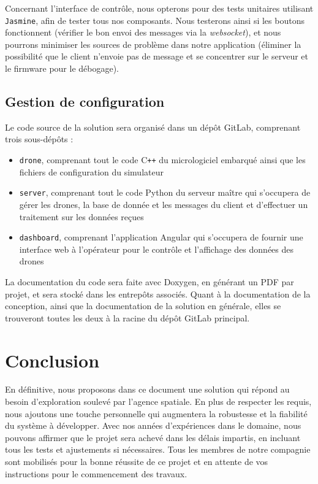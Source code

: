 \documentclass{mistcoursedoc}
\begin{document}
Concernant l'interface de contrôle, nous opterons pour des tests unitaires utilisant \texttt{Jasmine}, afin de tester tous nos composants. Nous testerons ainsi si les boutons fonctionnent (vérifier le bon envoi des messages via la \emph{websocket}), et nous pourrons minimiser les sources de problème dans notre application (éliminer la possibilité que le client n'envoie pas de message et se concentrer sur le serveur et le firmware pour le débogage).

\subsection{Gestion de configuration}

Le code source de la solution sera organisé dans un dépôt GitLab, comprenant trois sous-dépôts :
\begin{itemize}
  \item \texttt{drone}, comprenant tout le code C\texttt{++} du micrologiciel embarqué ainsi que les fichiers de configuration du simulateur
  \item \texttt{server}, comprenant tout le code Python du serveur maître qui s’occupera de gérer les drones, la base de donnée et les messages du client et d’effectuer un traitement sur les données reçues
  \item \texttt{dashboard}, comprenant l'application Angular qui s’occupera de fournir une interface web à l’opérateur pour le contrôle et l’affichage des données des drones
\end{itemize}

La documentation du code sera faite avec Doxygen, en générant un PDF par projet, et sera stocké dans les entrepôts associés. Quant à la documentation de la conception, ainsi que la documentation de la solution en générale, elles se trouveront toutes les deux à la racine du dépôt GitLab principal.

\section*{Conclusion}

En définitive, nous proposons dans ce document une solution qui répond au besoin d’exploration soulevé par l'agence spatiale. En plus de respecter les requis, nous ajoutons une touche personnelle qui augmentera la robustesse et la fiabilité du système à développer. Avec nos années d'expériences dans le domaine, nous pouvons affirmer que le projet sera achevé dans les délais impartis, en incluant tous les tests et ajustements si nécessaires. Tous les membres de notre compagnie sont mobilisés pour la bonne réussite de ce projet et en attente de vos instructions pour le commencement des travaux.
\end{document}
